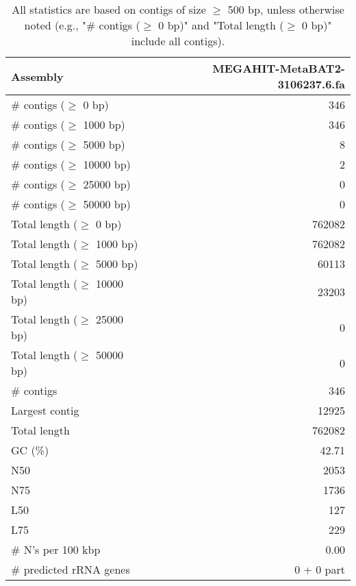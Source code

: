 \documentclass[12pt,a4paper]{article}
\begin{document}
\begin{table}[ht]
\begin{center}
\caption{All statistics are based on contigs of size $\geq$ 500 bp, unless otherwise noted (e.g., "\# contigs ($\geq$ 0 bp)" and "Total length ($\geq$ 0 bp)" include all contigs).}
\begin{tabular}{|l*{1}{|r}|}
\hline
Assembly & MEGAHIT-MetaBAT2-3106237.6.fa \\ \hline
\# contigs ($\geq$ 0 bp) & 346 \\ \hline
\# contigs ($\geq$ 1000 bp) & 346 \\ \hline
\# contigs ($\geq$ 5000 bp) & 8 \\ \hline
\# contigs ($\geq$ 10000 bp) & 2 \\ \hline
\# contigs ($\geq$ 25000 bp) & 0 \\ \hline
\# contigs ($\geq$ 50000 bp) & 0 \\ \hline
Total length ($\geq$ 0 bp) & 762082 \\ \hline
Total length ($\geq$ 1000 bp) & 762082 \\ \hline
Total length ($\geq$ 5000 bp) & 60113 \\ \hline
Total length ($\geq$ 10000 bp) & 23203 \\ \hline
Total length ($\geq$ 25000 bp) & 0 \\ \hline
Total length ($\geq$ 50000 bp) & 0 \\ \hline
\# contigs & 346 \\ \hline
Largest contig & 12925 \\ \hline
Total length & 762082 \\ \hline
GC (\%) & 42.71 \\ \hline
N50 & 2053 \\ \hline
N75 & 1736 \\ \hline
L50 & 127 \\ \hline
L75 & 229 \\ \hline
\# N's per 100 kbp & 0.00 \\ \hline
\# predicted rRNA genes & 0 + 0 part \\ \hline
\end{tabular}
\end{center}
\end{table}
\end{document}
